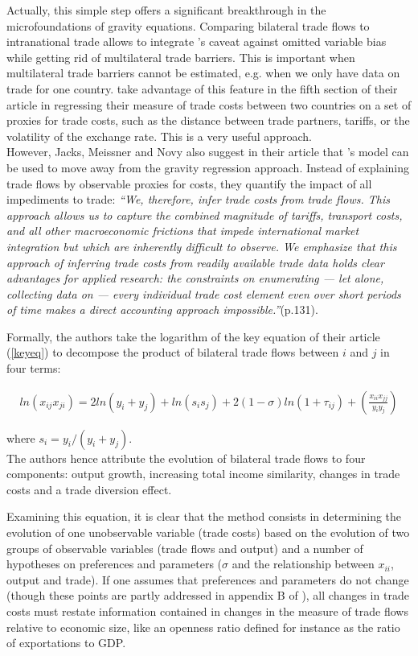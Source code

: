 \documentclass{article}
\begin{document}
Actually, this simple step offers a significant breakthrough in the microfoundations of gravity equations. 
Comparing bilateral trade flows to intranational trade allows to integrate \cite{AW2003}'s caveat against omitted variable bias while getting rid of multilateral trade barriers.
This is important when multilateral trade barriers cannot be estimated, e.g. when we only have data on trade for one country. \cite{JMN2011} take advantage of this feature in the fifth section of their article in regressing their measure of trade costs between two countries on a set of proxies for trade costs, such as the distance between trade partners, tariffs, or the volatility of the exchange rate. This is a very useful approach.\\

However, Jacks, Meissner and Novy also suggest in their article that \cite{AW2003}'s model can be used to move away from the gravity regression approach. Instead of explaining trade flows by observable proxies for costs, they quantify the impact of all impediments to trade:
\emph{``We, therefore, infer trade costs from trade flows.
This approach allows us to capture the combined magnitude of tariffs, transport costs, and all other macroeconomic frictions that impede international market integration but which are inherently difficult to observe.
We emphasize that this approach of inferring trade costs from readily available trade data holds clear advantages for applied research: the constraints on enumerating — let alone, collecting data on — every individual trade cost element even over short periods of time makes a direct accounting approach impossible.''}(p.131).

Formally, the authors take the logarithm of the key equation of their article (\ref{keyeq}) to decompose the product of bilateral trade flows between $i$ and $j$ in four terms:

\begin{eqnarray}
ln (x_{ij}x_{ji})= 2 ln(y_i + y_j)+ ln (s_i s_j) + 2(1-\sigma)ln(1+\tau_{ij})+ \left(\frac{x_{ii} x_{jj}}{y_i y_j}\right)
\end{eqnarray}

where $s_i=y_i/(y_i+y_j)$.\\

The authors hence attribute the evolution of bilateral trade flows to four components: output growth, increasing total income similarity, changes in trade costs and a trade diversion effect.

Examining this equation, it is clear that the method consists in determining the evolution of one unobservable variable (trade costs) based on the evolution of two groups of observable variables (trade flows and output) and a number of hypotheses on preferences and parameters ($\sigma$ and the relationship between $x_{ii}$, output and trade). If one assumes that preferences and parameters do not change (though these points are partly addressed  in appendix B of  \cite{JMN2011}), all changes in trade costs must restate information contained in changes in the measure of trade flows relative to economic size, like an openness ratio defined for instance as the ratio of exportations to GDP. 
\end{document}
